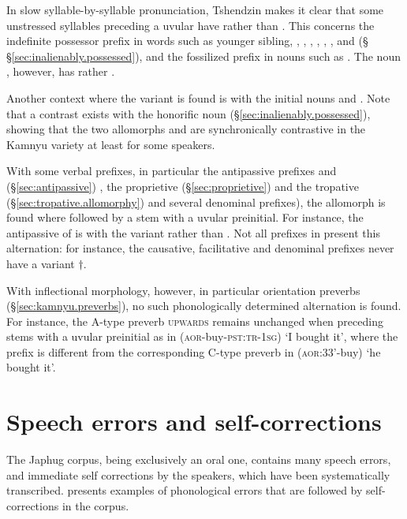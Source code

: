 In slow syllable-by-syllable pronunciation, Tshendzin makes it clear that some unstressed syllables preceding a uvular have  rather than . This concerns the indefinite possessor prefix in words such as  {younger sibling}, , , , , , ,  and  (§ §\ref{sec:inalienably.possessed}), and the fossilized prefix in nouns such as . The noun , however, has  rather .

Another context where the variant  is found is with the  initial nouns  and . Note that a contrast exists with the honorific noun  (§\ref{sec:inalienably.possessed}), showing that the two allomorphs  and  are synchronically contrastive in the Kamnyu variety at least for some speakers.

With some verbal prefixes, in particular the antipassive prefixes  and  (§\ref{sec:antipassive}) , the proprietive  (§\ref{sec:proprietive}) and the tropative  (§\ref{sec:tropative.allomorphy}) and several denominal prefixes), the  allomorph is found where followed by a stem with a uvular preinitial. For instance, the antipassive of  is  with the variant  rather than . Not all prefixes in  present this alternation: for instance, the causative, facilitative and denominal prefixes  never have a variant $\dagger$.

With inflectional morphology, however, in particular orientation preverbs (§\ref{sec:kamnyu.preverbs}), no such phonologically determined alternation is found. For instance, the A-type preverb  \textsc{upwards} remains unchanged when preceding stems with a uvular preinitial as in  (\textsc{aor}-buy-\textsc{pst}:\textsc{tr}-\textsc{1sg}) `I bought it', where the prefix  is different from the corresponding C-type preverb  in  (\textsc{aor}:3\fl{}3'-buy) `he bought it'.

\section{Speech errors and self-corrections} \label{sec:self.corrections}
The Japhug corpus, being exclusively an oral one, contains many speech errors, and immediate self corrections by the speakers, which have been systematically transcribed.  presents examples of phonological errors that are followed by self-corrections in the corpus.

